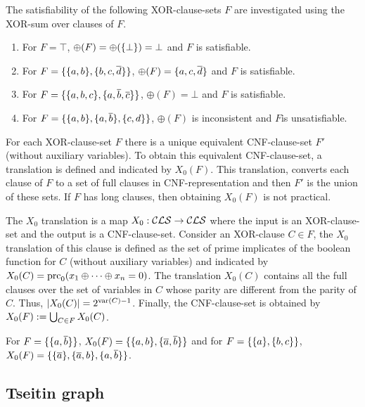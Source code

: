 \documentclass{report}
\begin{document}
\begin{examp}\label{exp:xorcls}
The satisfiability of the following XOR-clause-sets $F$ are investigated using the XOR-sum over clauses of $F$.
  \begin{enumerate}
  \item For $F=\top$, $ \oplus(F)= \oplus(\{ \bot \})=\bot$ and $F$ is satisfiable.
  \item For $F=\{ \{ a,b \},\{ b,c,\overline d \} \}$, $ \oplus(F) = \{ a,c,\overline d \}$ and $F$ is satisfiable.
  \item For $F=\{ \{ a,b,c \},\{ a, \overline b, \overline c \} \}$, $ \oplus(F) = \bot$ and $F$ is satisfiable.  
  \item  For $F=\{ \{ a,b \},\{ a, \overline b \},\{ c,d \} \}$, $\oplus (F)$ is inconsistent and $F$is unsatisfiable.
  \end{enumerate}
\end{examp}

For each XOR-clause-set $F$ there is a unique equivalent CNF-clause-set $F'$ (without auxiliary variables). To obtain this equivalent CNF-clause-set, a translation is defined and indicated by $X_0(F)$. This translation, converts each clause of $F$ to a set of full clauses in CNF-representation and then $F'$ is the union of these sets. If $F$ has long clauses, then obtaining $X_0(F)$ is not practical.

\begin{defi}\label{def:x0tr}
\cite{h8} The $X_0$ translation is a map $X_0: \mathcal{CLS} \rightarrow \mathcal{CLS}$ where the input is an XOR-clause-set and the output is a  CNF-clause-set. Consider an XOR-clause $C \in F$, the $X_0$ translation of this clause is defined as the set of prime implicates of the boolean function for $C$ (without auxiliary variables) and indicated by $X_0(C)=\operatorname{prc}_0(x_1 \oplus \dots \oplus x_n = 0)$. The translation $X_0(C)$ contains all the full clauses over the set of variables in $C$ whose parity are different from the parity of $C$. Thus, $\lvert X_0(C) \rvert=2^{\operatorname{var}(C)-1}$. Finally, the CNF-clause-set is obtained by $X_0(F) := \bigcup_{C \in F} X_0(C)$.
\end{defi} 

\begin{examp}\label{exp:X0}
For $F=\{ \{ a,\overline b \} \}$, $X_0(F)= \{ \{ a,b \},\{ \overline a,\overline b \} \}$ and for $F=\{ \{ a \},\{ b,c \} \}$, $X_0(F)=\{ \{ \overline a \},\{ \overline a, b \}, \{ a, \overline b \} \}$.
\end{examp}
\subsection{Tseitin graph}
\label{sec:Tseitin graph}
\end{document}
